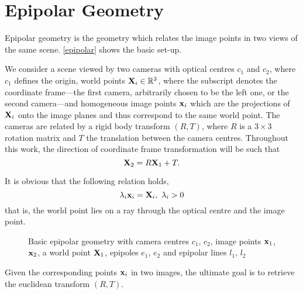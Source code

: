 \section{Epipolar Geometry}
\label{sec:epipolar}

Epipolar geometry is the geometry which relates the image points in two views of
the same scene. \autoref{epipolar} shows the basic set-up. 

We consider a scene viewed by two cameras with optical centres $c_1$ and $c_2$,
where $c_1$ defines the origin,
world points $\mathbf{X}_i\in\mathbb{R}^3$, where the subscript denotes the coordinate
frame---the first camera, arbitrarily chosen to be the left one, or the second
camera---and homogeneous image points $\mathbf{x}_i$ which are the projections of $\mathbf{X}_i$
onto the image planes and thus correspond to the same world point. The cameras
are related by a rigid body transform $(R,T)$, where $R$ is a $3\times3$
rotation matrix and $T$ the translation between the camera centres. Throughout
this work, the direction of coordinate frame transformation will be such that
\begin{equation}\label{eq:camera_transform}
   \mathbf{X}_2 = R\mathbf{X}_1 + T.
\end{equation}

It is obvious that the following relation holds,
\begin{equation}\label{eq:project_world_point}
   \lambda_i\mathbf{x}_i = \mathbf{X}_i, ~\lambda_i > 0
\end{equation}
that is, the world point lies on a ray through the optical centre and the image
point. 

\begin{figure}[h]
   {\centering      
      
      \caption[Basic epipolar geometry]{Basic epipolar geometry with camera centres $c_1$, $c_2$, image
      points $\mathbf{x}_1$, $\mathbf{x}_2$, a world point $\mathbf{X}_1$, epipoles
   $e_1$, $e_2$ and epipolar lines $l_1$, $l_2$}
   \label{epipolar}}
\end{figure}

Given the corresponding points $\mathbf{x}_i$ in two images, the ultimate goal is
to retrieve the euclidean transform $(R,T)$.

